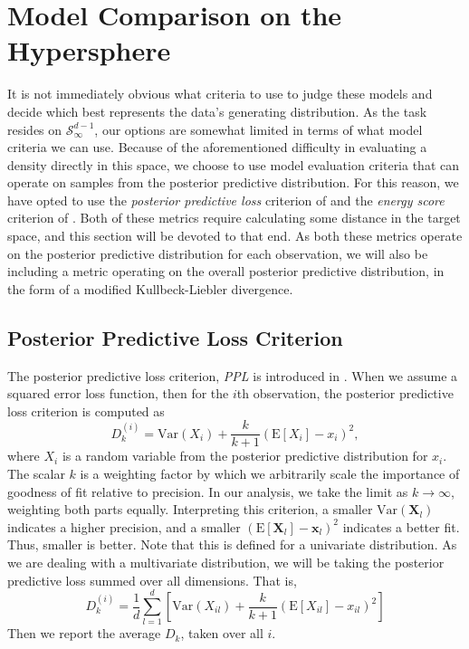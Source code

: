 \section{Model Comparison on the Hypersphere}
\label{sec:evaluation}
It is not immediately obvious what criteria to use to judge these models and decide which best
  represents the data's generating distribution.  As the task resides on $\mathcal{S}_{\infty}^{d-1}$,
  our options are somewhat limited in terms of what model criteria we can use.  Because of the aforementioned
  difficulty in evaluating a density directly in this space, we choose to use model evaluation
  criteria that can operate on samples from the posterior predictive distribution.  For this reason,
  we have opted to use the \emph{posterior predictive loss} criterion of \cite{gelfand1998} and the
  \emph{energy score} criterion of \cite{gneiting2007}.  Both of these metrics require calculating
  some distance in the target space, and this section will be devoted to that end.  As both these
  metrics operate on the posterior predictive distribution for each observation, we will also be
  including a metric operating on the overall posterior predictive distribution, in the form of a
  modified Kullbeck-Liebler divergence.

\subsection{Posterior Predictive Loss Criterion}
The posterior predictive loss criterion, \emph{PPL} is introduced in \cite{gelfand1998}.  When we
  assume a squared error loss function, then for the $i$th observation, the posterior predictive
  loss criterion is computed as
  \begin{equation}
    \label{eq:ppl}
    D_{k}^{(i)} = \text{Var}\left(X_i\right) + \frac{k}{k + 1}\left(\text{E}[X_i] - x_i\right)^2,
  \end{equation}
  where $X_i$ is a random variable from the posterior predictive distribution for $x_i$.  The
  scalar $k$ is a weighting factor by which we arbitrarily scale the importance of goodness of fit
  relative to precision.  In our analysis, we take the limit as $k\to\infty$, weighting both
  parts equally.  Interpreting this criterion, a smaller $\text{Var}(\bm{X}_l)$ indicates a higher
  precision, and a smaller $(\text{E}[\bm{X}_l] - \bm{x}_l)^2$  indicates a better fit.  Thus,
  smaller is better.  Note that this is defined for a univariate distribution.  As we are dealing
  with a multivariate distribution, we will be taking the posterior predictive loss
  summed over all dimensions.  That is,
  \begin{equation}
    \label{eq:ppl2}
    D_k^{(i)} = \frac{1}{d}\sum_{l = 1}^{d}\left[\text{Var}(X_{il}) + \frac{k}{k+1}\left(\text{E}[X_{il}] - x_{il}\right)^2\right]
  \end{equation}
  Then we report the average $D_k$, taken over all $i$.


